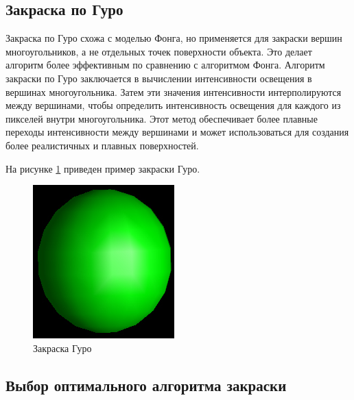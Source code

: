 \subsection{Закраска по Гуро}
Закраска по Гуро схожа с моделью Фонга, но применяется для закраски 
вершин многоугольников, а не отдельных точек поверхности объекта. Это 
делает алгоритм более эффективным по сравнению с алгоритмом Фонга.
Алгоритм закраски по Гуро заключается в вычислении интенсивности 
освещения в вершинах многоугольника. Затем эти значения интенсивности 
интерполируются между вершинами, чтобы определить интенсивность 
освещения для каждого из пикселей внутри многоугольника. Этот метод 
обеспечивает более плавные переходы интенсивности между вершинами и 
может использоваться для создания более реалистичных и плавных 
поверхностей\cite{CG}.

На рисунке \ref{img:gs} приведен пример закраски Гуро.

\begin{figure}[H]
	\begin{center}
		\includegraphics[scale=1.5]{img/gouraudshade.png}
	\end{center}
	\captionsetup{justification=centering}
	\caption{Закраска Гуро}
	\label{img:gs}
\end{figure}

\subsection{Выбор оптимального алгоритма закраски}

